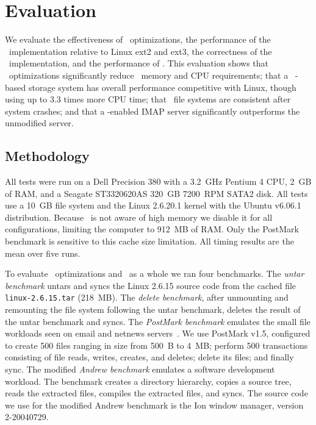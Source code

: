 
\section {Evaluation}
\label{sec:evaluation}
\label{eval}

We evaluate
%
the effectiveness of \patch\ optimizations,
%
the performance of the \Kudos\ implementation relative to Linux ext2
and ext3,
%
the correctness of the \Kudos\ implementation,
%
and the performance of \patchgroups.
%
This evaluation shows
%
that \patch\ optimizations significantly reduce \patch\ memory and CPU
requirements;
%
that a \Kudos\ \patch-based storage system has overall performance
competitive with Linux, though using up to 3.3 times more CPU time;
%
that \Kudos\ file systems are consistent after system crashes;
%
and that a \patchgroup-enabled IMAP server significantly outperforms
the unmodified server.

\subsection{Methodology}

All tests were run on a Dell Precision 380 with a 3.2~GHz Pentium 4
CPU, 2~GB of RAM, and a Seagate ST3320620AS 320~GB 7200~RPM SATA2 disk.
%
All tests use a 10~GB file system and the Linux 2.6.20.1 kernel
with the Ubuntu v6.06.1 distribution.
%
Because \Kudos\ is not aware of high memory we disable it for all
configurations, limiting the computer to 912~MB of RAM.
%
Only the PostMark benchmark is sensitive to this cache size limitation.
%
All timing results are the mean over five runs.

To evaluate \patch\ optimizations and \Kudos\ as a whole we ran four
benchmarks.
%
The \emph{untar benchmark} untars and syncs the Linux 2.6.15 source code
from the cached file \texttt{linux-2.6.15.tar} (218~MB).
%
The \emph{delete benchmark}, after unmounting and remounting the file
system following the untar benchmark, deletes the result of the untar
benchmark and syncs.
%
The \emph{PostMark benchmark} emulates the small file workloads seen
on email and netnews servers~\cite{postmark}. We use PostMark v1.5,
configured to create 500 files ranging in size from 500~B to 4~MB;
perform 500 transactions consisting of file reads, writes, creates,
and deletes; delete its files; and finally sync.
%
The modified \emph{Andrew benchmark} emulates a software development
workload.  The benchmark creates a directory hierarchy, copies a
source tree, reads the extracted files, compiles the extracted files,
and syncs. The source code we use for the modified Andrew benchmark is
the Ion window manager, version 2-20040729.

